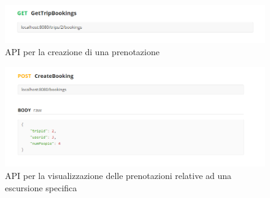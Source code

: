 \begin{figure}[htbp]
    \includegraphics[width=\textwidth]{images/iterazione2/postman-api/GetTripBookings.PNG}
    \centering
    \caption{API per la creazione di una prenotazione}\label{API creazione prenotazione}
\end{figure}
\begin{figure}[htbp]
    \includegraphics[width=\textwidth]{images/iterazione2/postman-api/CreateBooking.PNG}
    \centering
    \caption{API per la visualizzazione delle prenotazioni relative ad una escursione specifica}
    \label{visualizazione prenotazioni per escursione}
\end{figure}

\cleardoublepage 
